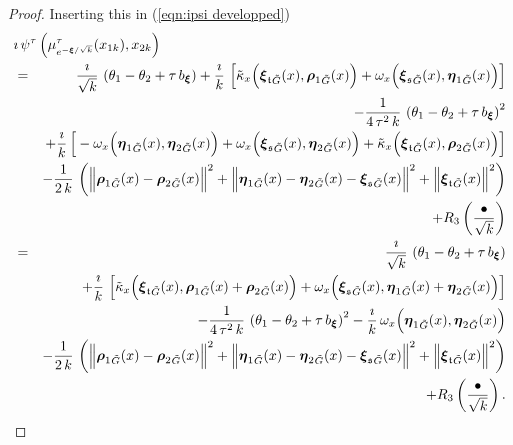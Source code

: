\documentclass[12pt,a4paper]{article}
\theoremstyle{plain}
\theoremstyle{definition}
\begin{document}
\begin{proof}
Inserting this in (\ref{eqn:ipsi developped})
\begin{eqnarray}
\label{eqn:ipsi developped 1}
\lefteqn{\imath\,\psi^\tau\left(\mu^\tau_{e^{-\boldsymbol{\xi}/\sqrt{k}}}(x_{1k}),x_{2k}   \right)   }\\
&=&   \frac{\imath}{\sqrt{k}}\,\left(\theta_1-\theta_2+\tau\,b_{\boldsymbol{\xi}} \right)                              
+\frac{\imath}{k}\,
\left[ \tilde{\kappa}_x \Big(
{\boldsymbol{\xi}_{\mathfrak{t}}}_{\tilde{G}}(x)
,
{\boldsymbol{\rho}_1}_{\tilde{G}}(x)\Big)
+\omega_x \Big(
{\boldsymbol{\xi}_{\mathfrak{s}}}_{\tilde{G}}(x),
{\boldsymbol{\eta}_1}_{\tilde{G}}(x)\Big)  \right]\nonumber\\
&&
-\frac{1}{4\,\tau^2\,k}\,\left( \theta_1-\theta_2+\tau\,b_{\boldsymbol{\xi}}   \right)^2\nonumber\\
&&
+\frac{\imath}{k}\,\Big[
-\omega_x\Big(
{\boldsymbol{\eta}_1}_{\tilde{G}}(x)
%
,
{\boldsymbol{\eta}_2}_{\tilde{G}}(x)  
\Big)+\omega_x\Big( {\boldsymbol{\xi}_{\mathfrak{s}}}_{\tilde{G}}(x),{\boldsymbol{\eta}_2}_{\tilde{G}}(x)  \Big)
+\tilde{\kappa}_x\Big({\boldsymbol{\xi}_{\mathfrak{t}}}_{\tilde{G}}(x) ,
{\boldsymbol{\rho}_2}_{\tilde{G}}(x)   \Big)
\Big]\nonumber\\
&&-\frac{1}{2\,k}\,\left( \Big\|
{\boldsymbol{\rho}_1}_{\tilde{G}}(x)-{\boldsymbol{\rho}_2}_{\tilde{G}}(x)\Big\|^2
+\Big\|{\boldsymbol{\eta}_1}_{\tilde{G}}(x)
-{\boldsymbol{\eta}_2}_{\tilde{G}}(x)-{\boldsymbol{\xi}_{\mathfrak{s}}}_{\tilde{G}}(x)\Big\|^2
%
+\Big\|{\boldsymbol{\xi}_{\mathfrak{t}}}_{\tilde{G}}(x)
%
% 
\Big\|^2       \right)\nonumber\\
&&
+R_3\left( \frac{\bullet}{\sqrt{k}} \right)
\nonumber\\
&=&   \frac{\imath}{\sqrt{k}}\,\left(\theta_1-\theta_2+\tau\,b_{\boldsymbol{\xi}} \right)  \nonumber\\
&&
+\frac{\imath}{k}\,
\left[ \tilde{\kappa}_x \Big(
{\boldsymbol{\xi}_{\mathfrak{t}}}_{\tilde{G}}(x)
,
{\boldsymbol{\rho}_1}_{\tilde{G}}(x)
+{\boldsymbol{\rho}_2}_{\tilde{G}}(x)\Big)
+\omega_x \Big(
{\boldsymbol{\xi}_{\mathfrak{s}}}_{\tilde{G}}(x),
{\boldsymbol{\eta}_1}_{\tilde{G}}(x)
+{\boldsymbol{\eta}_2}_{\tilde{G}}(x)
\Big)  \right]\nonumber\\
&&
-\frac{1}{4\,\tau^2\,k}\,\left( \theta_1-\theta_2+\tau\,b_{\boldsymbol{\xi}}   \right)^2
-\frac{\imath}{k}\,
\omega_x\Big(
{\boldsymbol{\eta}_1}_{\tilde{G}}(x)
%
,
{\boldsymbol{\eta}_2}_{\tilde{G}}(x)  
\Big)
\nonumber\\
&&-\frac{1}{2\,k}\,\left( \Big\|
{\boldsymbol{\rho}_1}_{\tilde{G}}(x)-{\boldsymbol{\rho}_2}_{\tilde{G}}(x)\Big\|^2
+\Big\|{\boldsymbol{\eta}_1}_{\tilde{G}}(x)
-{\boldsymbol{\eta}_2}_{\tilde{G}}(x)-{\boldsymbol{\xi}_{\mathfrak{s}}}_{\tilde{G}}(x)\Big\|^2
%
+\Big\|{\boldsymbol{\xi}_{\mathfrak{t}}}_{\tilde{G}}(x)
%
% 
\Big\|^2       \right)\nonumber\\
&&
+R_3\left( \frac{\bullet}{\sqrt{k}} \right).
\nonumber
\end{eqnarray}


\end{proof}
\end{document}
